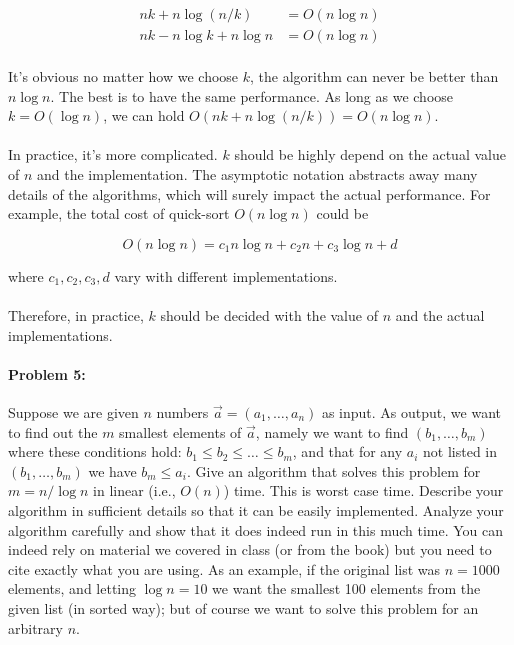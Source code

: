 \documentclass{article}
\begin{document}
$$\begin{aligned}
nk+n\log (n/k)&=O(n\log n)\\
nk-n\log k+n\log n&=O(n\log n)\\
\end{aligned}$$

It's obvious no matter how we choose $k$, the algorithm can never be better than $n\log n$. The best is to have the same performance. As long as we choose $k=O(\log n)$, we can hold $O(nk+n\log (n/k))=O(n\log n)$.

\paragraph{}
In practice, it's more complicated. $k$ should be highly depend on the actual value of $n$ and the implementation. The asymptotic notation abstracts away many details of the algorithms, which will surely impact the actual performance. For example, the total cost of quick-sort $O(n\log n)$ could be

$$
O(n\log n)=c_1n\log n+c_2n+c_3\log n+d
$$

where $c_1, c_2, c_3, d$ vary with different implementations.

\paragraph{}
Therefore, in practice, $k$ should be decided with the value of $n$ and the actual implementations.


\newpage
\paragraph{Problem 5:} 
Suppose we are given $n$ numbers $\vec{a}=(a_1,\dots,a_n)$ as input. As output, we want to find out the $m$ smallest elements of $\vec{a}$, namely we want to find $(b_1,\dots,b_m)$ where these conditions hold:  $b_1\leq b_2 \leq \dots \leq b_m$, and that for any $a_i$ not listed in $(b_1,\dots,b_m)$ we have $b_m \leq a_i.$ Give an algorithm that solves this problem for $m=n / \log n$ in linear (i.e., $O(n)$) time. This is worst case time. Describe your algorithm in sufficient details so that it can be easily implemented. Analyze your algorithm carefully and show that it does indeed run in this much time. You can indeed rely on material we covered in class (or from the book) but you need to cite exactly what you are using. As an example, if the original list was $n=1000$ elements, and letting $\log n = 10$ we want the smallest 100 elements from the given list (in sorted way); but of course we want to solve this problem for an arbitrary $n$.
\end{document}
